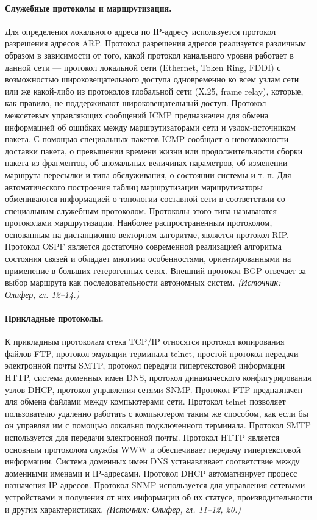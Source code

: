 \documentclass[a4paper,12pt]{article}
\begin{document}
\paragraph{Служебные протоколы и маршрутизация.}
Для определения локального адреса по IP-адресу используется протокол разрешения адресов ARP. Протокол разрешения адресов реализуется различным образом в зависимости от того, какой протокол канального уровня работает в данной сети — протокол локальной сети (Ethernet, Token Ring, FDDI) с возможностью широковещательного доступа одновременно ко всем узлам сети или же какой-либо из протоколов глобальной сети (X.25, frame relay), которые, как правило, не поддерживают широковещательный доступ. Протокол межсетевых управляющих сообщений ICMP предназначен для обмена информацией об ошибках между маршрутизаторами сети и узлом-источником пакета. С помощью специальных пакетов ICMP сообщает о невозможности доставки пакета, о превышении времени жизни или продолжительности сборки пакета из фрагментов, об аномальных величинах параметров, об изменении маршрута пересылки и типа обслуживания, о состоянии системы и т. п. Для автоматического построения таблиц маршрутизации маршрутизаторы обмениваются информацией о топологии составной сети в соответствии со специальным служебным протоколом. Протоколы этого типа называются протоколами маршрутизации. Наиболее распространенным протоколом, основанным на дистанционно-векторном алгоритме, является протокол RIP. Протокол OSPF является достаточно современной реализацией алгоритма состояния связей и обладает многими особенностями, ориентированными на применение в больших гетерогенных сетях. Внешний протокол BGP отвечает за выбор маршрута как последовательности автономных систем.
\textit{(Источник: Олифер, гл. 12–14.)}

\paragraph{Прикладные протоколы.}
К прикладным протоколам стека TCP/IP относятся протокол копирования файлов FTP, протокол эмуляции терминала telnet, простой протокол передачи электронной почты SMTP, протокол передачи гипертекстовой информации HTTP, система доменных имен DNS, протокол динамического конфигурирования узлов DHCP, протокол управления сетями SNMP. Протокол FTP предназначен для обмена файлами между компьютерами сети. Протокол telnet позволяет пользователю удаленно работать с компьютером таким же способом, как если бы он управлял им с помощью локально подключенного терминала. Протокол SMTP используется для передачи электронной почты. Протокол HTTP является основным протоколом службы WWW и обеспечивает передачу гипертекстовой информации. Система доменных имен DNS устанавливает соответствие между доменными именами и IP-адресами. Протокол DHCP автоматизирует процесс назначения IP-адресов. Протокол SNMP используется для управления сетевыми устройствами и получения от них информации об их статусе, производительности и других характеристиках.
\textit{(Источник: Олифер, гл. 11–12, 20.)}
\end{document}
